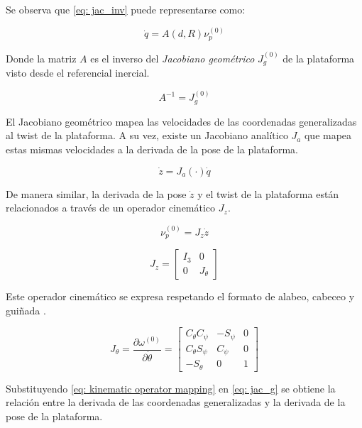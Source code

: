 Se observa que \ref{eq: jac_inv} puede 
representarse como:

\begin{equation} \label{eq: jac_g}
\dot{q} = A(d,R) \nu_p^{(0)}
\end{equation}

Donde la matriz $A$ es el inverso del 
\emph{Jacobiano geométrico} 
$J_g^{(0)}$ de la plataforma 
visto desde el referencial inercial. 

\begin{equation}
 A^{-1} = J_g^{(0)}
\end{equation}

El Jacobiano geométrico mapea las velocidades 
de las coordenadas generalizadas al twist de 
la plataforma.
A su vez, existe un Jacobiano analítico $J_a$ que mapea
estas mismas velocidades a la derivada de la pose
de la plataforma.

\begin{equation} \label{eq: jac_a}
\dot{z} = J_a(\cdot)\dot{q}
\end{equation}

De manera similar, la derivada de la pose $\dot z$
y el twist de la plataforma están relacionados 
a través de un operador cinemático $J_z$.

\begin{equation}\label{eq: kinematic operator mapping}
\nu_p^{(0)} = J_z\dot{z}
\end{equation}

\begin{equation}
 J_z = \begin{bmatrix}
        I_3 & 0\\
        0 & J_\theta
      \end{bmatrix}
\end{equation}

Este operador cinemático se expresa respetando 
el formato de alabeo, cabeceo y guiñada 
\cite{olguin20183d}.

\begin{equation}\label{eq: kinematic operator}
 J_\theta = \dfrac{\partial \omega^{(0)}}{\partial \dot \theta}= \begin{bmatrix}
        C_\theta C_\psi & -S_\psi & 0\\
        C_\theta S_\psi & C_\psi & 0\\
        -S_\theta & 0 & 1
      \end{bmatrix}
\end{equation}

Substituyendo \eqref{eq: kinematic operator mapping}
en \eqref{eq: jac_g} se obtiene la relación entre
la derivada de las coordenadas generalizadas y 
la derivada de la pose de la plataforma.

